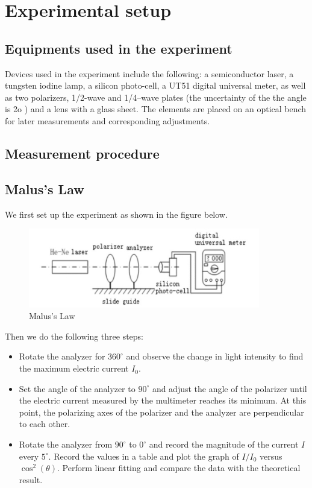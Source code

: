 \documentclass[12pt, a4paper, oneside]{article}
\begin{document}
\section{Experimental setup}
\indent

\subsection{Equipments used in the experiment}
\indent

Devices used in the experiment include the following: a semiconductor laser, a tungsten iodine lamp,
a silicon photo-cell, a UT51 digital universal meter, as well as two polarizers, 1/2-wave
and 1/4–wave plates (the uncertainty of the the angle is 2o
) and a lens with a glass sheet.
The elements are placed on an optical bench for later measurements and corresponding adjustments.

\subsection{Measurement procedure}
\indent

\subsection{Malus's Law}
\indent

We first set up the experiment as shown in the figure below. 
\begin{figure}
	\centering
	\includegraphics[width=0.9\textwidth]{Malu.jpg}
	\caption{Malus's Law}
	\label{fig1}
\end{figure}
Then we do the following three steps:
\begin{itemize}
    \item Rotate the analyzer for $360^\circ$ and observe the change in light intensity to find the maximum electric current \(I_0\).
    \item Set the angle of the analyzer to $90^\circ${} and adjust the angle of the polarizer until the electric current measured by the multimeter reaches its minimum. At this point, the polarizing axes of the polarizer and the analyzer are perpendicular to each other.
    \item Rotate the analyzer from $90^\circ${} to $0^\circ${} and record the magnitude of the current \(I\) every $5^\circ$. Record the values in a table and plot the graph of \(I / I_0\) versus \(\cos^2(\theta)\). Perform linear fitting and compare the data with the theoretical result.
\end{itemize}
\end{document}
